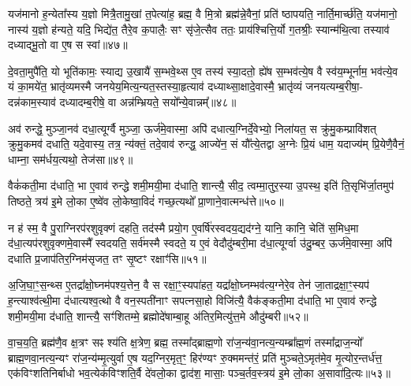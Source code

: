यज॑मानो ह॒न्येता᳚स्य य॒ज्ञो मित्रै॒तामु॒खां त॒पेत्या॑ह॒ ब्रह्म॒ वै मि॒त्रो ब्रह्म॑न्ने॒वैनां॒ प्रति॑ ष्ठापयति॒ नार्ति॒मार्च्छ॑ति॒ यज॑मानो॒ नास्य॑ य॒ज्ञो ह॑न्यते॒ यदि॒ भिद्ये॑त॒ तैरे॒व क॒पालैः॒ सꣳ सृ॑जे॒त्सैव ततः॒ प्राय॑श्चित्ति॒र्यो ग॒तश्रीः॒ स्यान्म॑थि॒त्वा तस्याव॑ दध्याद्भू॒तो वा ए॒ष स स्वां॥४७॥

दे॒वता॒मुपै॑ति॒ यो भूति॑कामः॒ स्याद्य उ॒खायै॑ स॒म्भवे॒थ्स ए॒व तस्य॑ स्या॒दतो॒ ह्ये॑ष स॒म्भव॑त्ये॒ष वै स्व॑य॒म्भूर्नाम॒ भव॑त्ये॒व यं का॒मये॑त॒ भ्रातृ॑व्यमस्मै जनयेय॒मित्य॒न्यत॒स्तस्या॒हृत्याव॑ दध्याथ्सा॒क्षादे॒वास्मै॒ भ्रातृ॑व्यं जनयत्यम्ब॒रीषा॒- दन्न॑काम॒स्याव॑ दध्यादम्ब॒रीषे॒ वा अन्न॑म्भ्रियते॒ सयो᳚न्ये॒वान्नम्᳚॥४८॥

अव॑ रुन्द्धे॒ मुञ्जा॒नव॑ दधा॒त्यूर्ग्वै मुञ्जा॒ ऊर्ज॑मे॒वास्मा॒ अपि॑ दधात्य॒ग्निर्दे॒वेभ्यो॒ निला॑यत॒ स क्रु॑मु॒कम्प्रावि॑शत् क्रुमु॒कमव॑ दधाति॒ यदे॒वास्य॒ तत्र॒ न्य॑क्तं॒ तदे॒वाव॑ रुन्द्ध॒ आज्ये॑न॒ सं यौ᳚त्ये॒तद्वा अ॒ग्नेः प्रि॒यं धाम॒ यदाज्य॑म् प्रि॒येणै॒वैनं॒ धाम्ना॒ सम॑र्धय॒त्यथो॒ तेज॑सा॥४९॥

वैकं॑कती॒मा द॑धाति॒ भा ए॒वाव॑ रुन्द्धे शमी॒मयी॒मा द॑धाति॒ शान्त्यै॒ सीद॒ त्वम्मा॒तुर॒स्या उ॒पस्थ॒ इति॑ ति॒सृभि॑र्जा॒तमुप॑ तिष्ठते॒ त्रय॑ इ॒मे लो॒का ए॒ष्वे॑व लो॒केष्वा॒विदं॑ गच्छ॒त्यथो᳚ प्रा॒णाने॒वात्मन्ध॑त्ते॥५०॥

{}

न ह॑ स्म॒ वै पु॒राग्निरप॑रशुवृक्णं दहति॒ तद॑स्मै प्रयो॒ग ए॒वर्\mbox{}षि॑रस्वदय॒द्यद॑ग्ने॒ यानि॒ कानि॒ चेति॑ स॒मिध॒मा द॑धा॒त्यप॑रशुवृक्णमे॒वास्मै᳚ स्वदयति॒ सर्व॑मस्मै स्वदते॒ य ए॒वं वेदौदु॑म्बरी॒मा द॑धा॒त्यूर्ग्वा उ॑दु॒म्बर॒ ऊर्ज॑मे॒वास्मा॒ अपि॑ दधाति प्र॒जाप॑तिर॒ग्निम॑सृजत॒ तꣳ सृ॒ष्टꣳ रक्षाꣳ॑सि॥५१॥

अ॒जि॒घा॒ꣳ॒स॒न्थ्स ए॒तद्रा᳚क्षो॒घ्नम॑पश्य॒त्तेन॒ वै स रक्षा॒ꣳ॒स्यपा॑हत॒ यद्रा᳚क्षो॒घ्नम्भव॑त्य॒ग्नेरे॒व तेन॑ जा॒ताद्रक्षा॒ꣳ॒स्यप॑ ह॒न्त्याश्व॑त्थी॒मा द॑धात्यश्व॒त्थो वै वन॒स्पती॑नाꣳ सपत्नसा॒हो विजि॑त्यै॒ वैक॑ङ्कती॒मा द॑धाति॒ भा ए॒वाव॑ रुन्द्धे शमी॒मयी॒मा द॑धाति॒ शान्त्यै॒ सꣳ॑शितम्मे॒ ब्रह्मोदे॑षाम्बा॒हू अ॑तिर॒मित्यु॑त्त॒मे औदु॑म्बरी॥५२॥

वा॒च॒य॒ति॒ ब्रह्म॑णै॒व क्ष॒त्रꣳ सꣴ श्य॑ति क्ष॒त्रेण॒ ब्रह्म॒ तस्मा᳚द्ब्राह्म॒णो रा॑ज॒न्य॑वा॒नत्य॒न्यम्ब्रा᳚ह्म॒णं तस्मा᳚द्राज॒न्यो᳚ ब्राह्म॒णवा॒नत्य॒न्यꣳ रा॑ज॒न्य॑म्मृ॒त्युर्वा ए॒ष यद॒ग्निर॒मृत॒ꣳ॒ हिर॑ण्यꣳ रु॒क्ममन्त॑रं॒ प्रति॑ मुञ्चते॒\-ऽमृत॑मे॒व मृ॒त्योर॒न्तर्ध॑त्त॒ एक॑विꣳशतिनिर्बाधो भव॒त्येक॑विꣳशति॒र्वै दे॑वलो॒का द्वाद॑श॒ मासाः॒ पञ्च॒र्तव॒स्त्रय॑ इ॒मे लो॒का अ॒सावा॑दि॒त्यः॥५३॥

